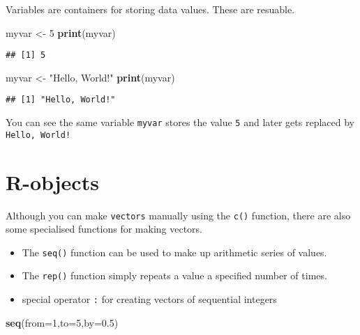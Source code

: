 \documentclass[
]{book}
\newenvironment{Shaded}{\begin{snugshade}}{\end{snugshade}}
\newcommand{\AttributeTok}[1]{\textcolor[rgb]{0.13,0.29,0.53}{#1}}
\newcommand{\DecValTok}[1]{\textcolor[rgb]{0.00,0.00,0.81}{#1}}
\newcommand{\FloatTok}[1]{\textcolor[rgb]{0.00,0.00,0.81}{#1}}
\newcommand{\FunctionTok}[1]{\textcolor[rgb]{0.13,0.29,0.53}{\textbf{#1}}}
\newcommand{\NormalTok}[1]{#1}
\newcommand{\OtherTok}[1]{\textcolor[rgb]{0.56,0.35,0.01}{#1}}
\newcommand{\StringTok}[1]{\textcolor[rgb]{0.31,0.60,0.02}{#1}}
\providecommand{\tightlist}{%
  \setlength{\itemsep}{0pt}\setlength{\parskip}{0pt}}
\begin{document}
Variables are containers for storing data values. These are resuable.

\begin{Shaded}
\begin{Highlighting}[]
\NormalTok{myvar }\OtherTok{\textless{}{-}} \DecValTok{5}
\FunctionTok{print}\NormalTok{(myvar)}
\end{Highlighting}
\end{Shaded}

\begin{verbatim}
## [1] 5
\end{verbatim}

\begin{Shaded}
\begin{Highlighting}[]
\NormalTok{myvar }\OtherTok{\textless{}{-}} \StringTok{"Hello, World!"}
\FunctionTok{print}\NormalTok{(myvar)}
\end{Highlighting}
\end{Shaded}

\begin{verbatim}
## [1] "Hello, World!"
\end{verbatim}

You can see the same variable \texttt{myvar} stores the value \texttt{5} and later gets replaced
by \texttt{Hello,\ World!}

\section{R-objects}\label{r-objects}

Although you can make \texttt{vectors} manually using the \texttt{c()} function, there are also
some specialised functions for making vectors.

\begin{itemize}
\tightlist
\item
  The \texttt{seq()} function can be used to make up arithmetic series of values.
\item
  The \texttt{rep()} function simply repeats a value a specified number of times.
\item
  special operator \texttt{:} for creating vectors of sequential integers
\end{itemize}

\begin{Shaded}
\begin{Highlighting}[]
\FunctionTok{seq}\NormalTok{(}\AttributeTok{from=}\DecValTok{1}\NormalTok{,}\AttributeTok{to=}\DecValTok{5}\NormalTok{,}\AttributeTok{by=}\FloatTok{0.5}\NormalTok{)}
\end{Highlighting}
\end{Shaded}
\end{document}
